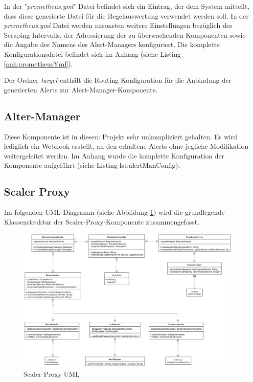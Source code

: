 In der "\emph{prometheus.yml}" Datei befindet sich ein Eintrag, der dem System mitteilt, dass diese generierte Datei für die Regelauswertung verwendet werden soll. In der \emph{prometheus.yml} Datei werden ansonsten weitere Einstellungen bezüglich des Scraping-Intervalls, der Adressierung der zu überwachenden Komponenten sowie die Angabe des Namens des Alert-Managers konfiguriert. Die komplette Konfigurationsdatei befindet sich im Anhang (siehe Listing \ref{anh:prometheusYml}).

Der Ordner \emph{target} enthält die Routing Konfiguration für die Anbindung der generierten Alerts zur Alert-Manager-Komponente.
\subsection{Alter-Manager \checkmark}
Diese Komponente ist in diesem Projekt sehr unkompliziert gehalten. Es wird lediglich ein Webhook erstellt, an den erhaltene Alerts ohne jegliche Modifikation weitergeleitet werden. Im Anhang wurde die komplette Konfiguration der Komponente aufgeführt (siehe Listing lst:alertManConfig).


\subsection{Scaler Proxy \checkmark}

Im folgenden UML-Diagramm (siehe Abbildung \ref{fig:proxyScalerUml}) wird die grundlegende Klassenstruktur der Scaler-Proxy-Komponente zusammengefasst. 

\begin{figure}[ht!]
	\centering
	\includegraphics[width=\linewidth]{kapitel/problemloesung/implementierung/_img/scaler-proxy-uml}
	\caption[Scaler-Proxy UML]{Scaler-Proxy UML}
	\label{fig:proxyScalerUml}
\end{figure}

